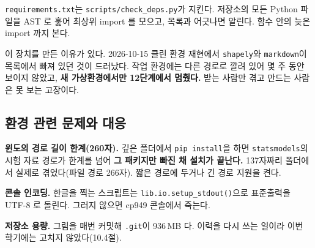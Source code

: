 \texttt{requirements.txt}는 \texttt{scripts/check\_deps.py}가 지킨다. 저장소의
모든 Python 파일을 AST 로 훑어 최상위 import 를 모으고, 목록과 어긋나면 알린다.
함수 안의 늦은 import 까지 본다.

이 장치를 만든 이유가 있다. 2026-10-15 클린 환경 재현에서 \texttt{shapely}와
\texttt{markdown}이 목록에서 빠져 있던 것이 드러났다. 작업 환경에는 다른 경로로
깔려 있어 몇 주 동안 보이지 않았고, \textbf{새 가상환경에서만 12단계에서
멈췄다.} 받는 사람만 겪고 만드는 사람은 못 보는 고장이다.

\subsection{환경 관련 문제와 대응}

\textbf{윈도의 경로 길이 한계(260자).} 깊은 폴더에서 \texttt{pip install}을 하면
\texttt{statsmodels}의 시험 자료 경로가 한계를 넘어 \textbf{그 패키지만 빠진 채
설치가 끝난다.} 137자짜리 폴더에서 실제로 겪었다(파일 경로 266자). 짧은 경로에
두거나 긴 경로 지원을 켠다.

\textbf{콘솔 인코딩.} 한글을 찍는 스크립트는 \texttt{lib.io.setup\_stdout()}으로
표준출력을 UTF-8 로 돌린다. 그러지 않으면 cp949 콘솔에서 죽는다.

\textbf{저장소 용량.} 그림을 매번 커밋해 \texttt{.git}이 936\,MB 다. 이력을 다시
쓰는 일이라 이번 학기에는 고치지 않았다(10.4절).
